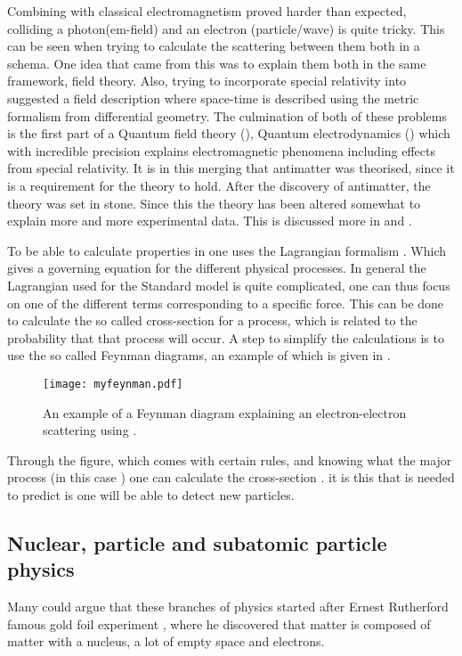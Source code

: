 Combining \abbrQM with classical electromagnetism proved harder than expected, colliding a photon(em-field) and an electron (particle/wave) is quite tricky. This can be seen when trying to calculate the scattering between them both in a \abbrQM schema. One idea that came from this was to explain them both in the same framework, field theory. Also, trying to incorporate special relativity into \abbrQM suggested a field description where space-time is described using the metric formalism from differential geometry.
The culmination of both of these problems is the first part of a Quantum field theory (\abbrQFT), Quantum electrodynamics (\abbrQED) which with incredible precision explains electromagnetic phenomena including effects from special relativity\citep{Zee:2003}. It is in this merging that antimatter was theorised, since it is a requirement for the theory to hold. After the discovery of antimatter, the theory was set in stone. Since this the theory has been altered somewhat to explain more and more experimental data. This is discussed more in  and .

To be able to calculate properties in \abbrQFT one uses the Lagrangian formalism \citep{Goldstein:2001}. Which gives a governing equation for the different physical processes. In general the Lagrangian used for the Standard model is quite complicated, one can thus focus on one of the different terms corresponding to a specific force. This can be done to calculate the so called cross-section for a process, which is related to the probability that that process will occur. A step to simplify the calculations is to use the so called Feynman diagrams, an example of which is given in . 

\begin{SCfigure}[][h]
 \centering
 \texttt{[image: myfeynman.pdf]}
  \caption{{\small An example of a Feynman diagram explaining an electron-electron scattering using \abbrQED.}}
    \label{fig:exFeynman}
\end{SCfigure}

Through the figure, which comes with certain rules, and knowing what the major process (in this case \abbrQED) one can calculate the cross-section \citep{Zee:2003}. it is this that is needed to predict is one will be able to detect new particles. 

\subsection{Nuclear, particle and subatomic particle physics}\label{sec:tb:subsec:nps}
Many could argue that these branches of physics started after Ernest Rutherford famous gold foil experiment \citep{Burchan:1995}, where he discovered that matter is composed of matter with a nucleus, a lot of empty space and electrons. 

